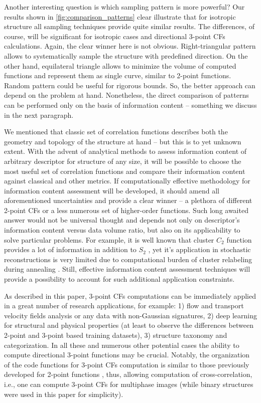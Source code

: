 \documentclass[reprint,amsmath,amssymb,aps,pre,showkeys,showpacs]{revtex4-1}
\begin{document}
Another interesting question is which sampling pattern is more powerful?
Our results shown in \cref{fig:comparison_patterns} clear illustrate that
for isotropic structure all sampling techniques provide quite similar results.
The differences, of course, will be significant for isotropic cases and
directional 3-point CFs calculations. Again, the clear winner here is not obvious.
Right-triangular pattern allows to systematically sample the structure with
predefined direction. On the other hand, equilateral triangle allows to
minimize the volume of computed functions and represent them as single curve,
similar to 2-point functions. Random pattern could be useful for rigorous bounds.
So, the better approach can depend on the problem at hand. Nonetheless,
the direct comparison of patterns can be performed only on the basis of
information content -- something we discuss in the next paragraph.

We mentioned that classic set of correlation functions describes both the
geometry and topology of the structure at hand -- but this is to yet unknown
extent. With the advent of analytical methods \cite{CHERKASOV2024129400} to
assess information content of arbitrary descriptor for structure of any size, it
will be possible to choose the most useful set of correlation functions and
compare their information content against classical and other metrics. If
computationally effective methodology for information content assessment will be
developed, it should amend all aforementioned uncertainties and provide a clear
winner -- a plethora of different 2-point CFs or a less numerous set of
higher-order functions. Such long awaited answer would not be universal thought
and depends not only on descriptor's information content versus data volume
ratio, but also on its applicability to solve particular problems. For example,
it is well known that cluster $C_2$ function provides a lot of information in
addition to $S_2$ \cite{JiaoPNAS}, yet it's application in stochastic
reconstructions is very limited due to computational burden of cluster
relabeling during annealing \cite{karsanina2015}. Still, effective information
content assessment techniques will provide a possibility to account for such
additional application constraints.

As described in this paper, 3-point CFs computations can be immediately applied
in a great number of research applications, for example: 1) flow and transport
velocity fields analysis or any data with non-Gaussian signatures, 2) deep
learning for structural and physical properties (at least to observe the
differences between 2-point and 3-point based training datasets), 3) structure
taxonomy and categorization. In all these and numerous other potential cases the
ability to compute directional 3-point functions may be crucial. Notably, the
organization of the code functions for 3-point CFs computation is similar to
those previously developed for 2-point functions \cite{CFsjlpaper}, thus,
allowing computation of cross-correlation, i.e., one can compute 3-point CFs for
multiphase images (while binary structures were used in this paper for
simplicity).
\end{document}

